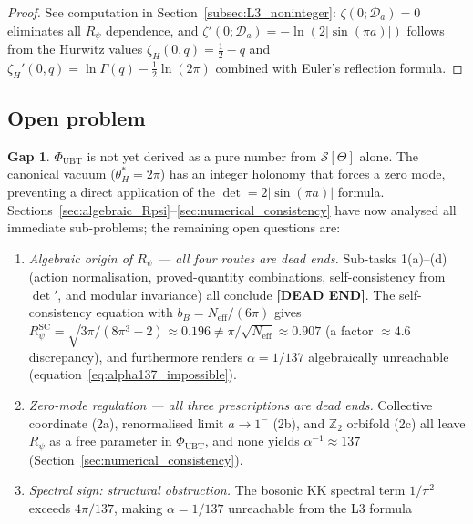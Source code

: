 \documentclass[11pt,a4paper]{article}
\theoremstyle{definition}
\newtheorem{gap}{Gap}
\theoremstyle{remark}
\begin{document}
\begin{proof}
  See computation in Section~\ref{subsec:L3_noninteger}:
  $\zeta(0;\mathcal{D}_a)=0$ eliminates all $R_\psi$ dependence,
  and $\zeta'(0;\mathcal{D}_a) = -\ln(2|\sin(\pi a)|)$ follows from the
  Hurwitz values $\zeta_H(0,q)=\frac{1}{2}-q$ and
  $\zeta_H'(0,q)=\ln\Gamma(q)-\frac{1}{2}\ln(2\pi)$
  combined with Euler's reflection formula.
\end{proof}

\subsection*{Open problem}

\begin{gap}
  \label{gap:phi_ubt_open}
  $\Phi_{\mathrm{UBT}}$ is not yet derived as a pure number from
  $\mathcal{S}[\Theta]$ alone.
  The canonical vacuum ($\theta_H^* = 2\pi$) has an integer holonomy
  that forces a zero mode, preventing a direct application of the
  $\det = 2|\sin(\pi a)|$ formula.
  Sections~\ref{sec:algebraic_Rpsi}--\ref{sec:numerical_consistency}
  have now analysed all immediate sub-problems; the remaining
  open questions are:
  \begin{enumerate}
    \item \emph{Algebraic origin of $R_\psi$ --- all four routes are dead ends.}
          Sub-tasks 1(a)--(d) (action normalisation, proved-quantity combinations,
          self-consistency from $\det'$, and modular invariance) all conclude
          \textbf{[DEAD END]}.
          The self-consistency equation with $b_B = N_{\mathrm{eff}}/(6\pi)$
          gives $R_\psi^{\mathrm{SC}} = \sqrt{3\pi/(8\pi^3-2)} \approx 0.196
          \neq \pi/\sqrt{N_{\mathrm{eff}}} \approx 0.907$ (a factor $\approx 4.6$ discrepancy),
          and furthermore renders $\alpha = 1/137$ algebraically unreachable
          (equation~\eqref{eq:alpha137_impossible}).
    \item \emph{Zero-mode regulation --- all three prescriptions are dead ends.}
          Collective coordinate (2a), renormalised limit $a\to 1^-$ (2b), and
          $\mathbb{Z}_2$ orbifold (2c) all leave $R_\psi$ as a free parameter
          in $\Phi_{\mathrm{UBT}}$, and none yields $\alpha^{-1} \approx 137$
          (Section~\ref{sec:numerical_consistency}).
    \item \emph{Spectral sign: structural obstruction.}
          The bosonic KK spectral term $1/\pi^2$ exceeds $4\pi/137$,
          making $\alpha = 1/137$ unreachable from the L3 formula

\end{enumerate}
\end{gap}
\end{document}
